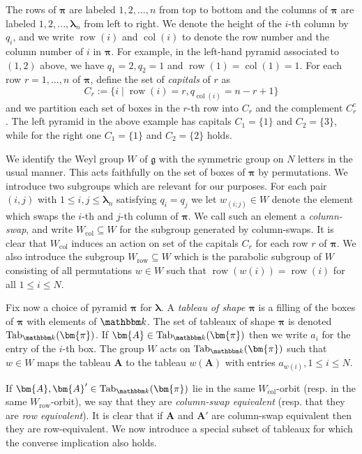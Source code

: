 \documentclass[twoside,12pt,reqno]{amsart}
\theoremstyle{remark}
\numberwithin{equation}{section}
\def\k{{\mathbbm k}}
\newcommand{\Tab}{\operatorname{Tab}}
\def\col{\operatorname{col}}
\def\col{\operatorname{col}}
\def\row{\operatorname{row}}
\def\bA{{\bm{A}}}
\def\blambda{{\bm{\lambda}}}
\def\bpi{{\bm{\pi}}}
\def\g{{\mathfrak g}}
\begin{document}
The rows of $\bpi$ are labeled $1,2,...,n$ from top to bottom and the columns of $\bpi$ are labeled $1,2,...,\blambda_n$ from left to right.
We denote the height of the $i$-th column by $q_i$, and we write $\row(i)$ and $\col(i)$ to denote the row number and the column number of $i$ in $\bpi$.
For example, in the left-hand pyramid associated to $(1,2)$ above, we have $q_1 = 2, q_2 = 1$ and $\row(1) = \col(1) = 1$.
For each row $r = 1, \dots, n$ of $\bpi$, define the set of \textit{capitals} of $r$ as 
$$C_r := \{ i \mid \row(i) = r, q_{\col(i)}=n-r+1 \}$$
and we partition each set of boxes in the $r$-th row into $C_r$ and the complement $C_r^c$.
The left pyramid in the above example has capitals $C_1 = \{1\}$ and $C_2 = \{3\}$, while for the right one $C_1 = \{1\}$ and $C_2 = \{2\}$ holds.

We identify the Weyl group $W$ of $\g$ with the symmetric group on $N$ letters in the usual manner.
This acts faithfully on the set of boxes of $\bpi$ by permutations.
We introduce two subgroups which are relevant for our purposes.
For each pair $(i,j)$ with $1\le i,j\le \blambda_n$ satisfying $q_i = q_j$ we let $w_{(i;j)} \in W$ denote the element which swaps the $i$-th and $j$-th column of $\bpi$.
We call such an element a {\em column-swap}, and write $W_{\col} \subseteq W$ for the subgroup generated by column-swaps.
It is clear that $W_{\col}$ induces an action on set of the capitals $C_r$ for each row $r$ of $\bpi$.
We also introduce the subgroup $W_{\row} \subseteq W$ which is the parabolic subgroup of $W$ consisting of all permutations $w \in W$ such that $\row(w(i)) = \row(i)$ for all $1 \leq i \leq N$.

Fix now a choice of pyramid $\bpi$ for $\blambda$. A {\it tableau of shape $\bpi$} is a filling of the boxes of $\bpi$ with elements of $\k$.
The set of tableaux of shape $\bpi$ is denoted $\Tab_\k(\bpi)$.
If $\bA \in \Tab_\k(\bpi)$ then we write $a_i$ for the entry of the $i$-th box. 
The group $W$  acts on $\Tab_\k(\bpi)$ such that $w\in W$ maps the tableau $\bA$ to the tableau $w(\bA)$ with entries $a_{w(i)}, 1 \leq i \leq N$.


If  $\bA, \bA' \in \Tab_\k(\bpi)$  lie in the same $W_{\col}$-orbit (resp. in the same $W_{\row}$-orbit), we say that they are {\it column-swap equivalent} (resp. that they are {\it row equivalent}).
It is clear that if $\bA$ and $\bA'$ are column-swap equivalent then they are row-equivalent.
We now introduce a special subset of tableaux for which the converse implication also holds.
\end{document}
